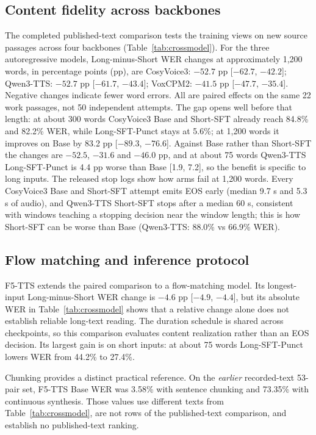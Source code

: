 \documentclass{article}
\begin{document}
\subsection{Content fidelity across backbones}
\label{sec:crossmodel}

The completed published-text comparison tests the training views on new source
passages across four backbones (Table~\ref{tab:crossmodel}). For the three
autoregressive models, Long-minus-Short WER changes at approximately 1,200 words,
in percentage points (pp), are CosyVoice3: $-52.7$ pp [$-62.7$, $-42.2$]; Qwen3-TTS:
$-52.7$ pp [$-61.7$, $-43.4$]; VoxCPM2: $-41.5$ pp [$-47.7$, $-35.4$].
Negative changes indicate fewer word errors. All are paired effects on the same
22 work passages, not 50 independent attempts. The gap opens well before that
length: at about 300 words CosyVoice3 Base and Short-SFT already reach 84.8\% and
82.2\% WER, while Long-SFT-Punct stays at 5.6\%; at 1,200 words it improves on Base
by 83.2 pp [$-89.3$, $-76.6$]. Against Base rather than Short-SFT
the changes are $-52.5$, $-31.6$ and $-46.0$ pp, and at about 75 words Qwen3-TTS
Long-SFT-Punct is 4.4 pp worse than Base [1.9, 7.2], so the benefit is specific
to long inputs. The released stop logs show how arms fail at 1,200 words. Every
CosyVoice3 Base and Short-SFT attempt emits EOS early (median 9.7 s and 5.3 s of
audio), and Qwen3-TTS Short-SFT stops after a median 60 s, consistent with windows
teaching a stopping decision near the window length; this is how Short-SFT can be
worse than Base (Qwen3-TTS: 88.0\% vs 66.9\% WER).

\subsection{Flow matching and inference protocol}
\label{sec:f5}

F5-TTS extends the paired comparison to a flow-matching model. Its longest-input
Long-minus-Short WER change is $-4.6$ pp [$-4.9$, $-4.4$], but its absolute WER in
Table~\ref{tab:crossmodel} shows that a relative change alone does not establish
reliable long-text reading. The duration schedule is shared across checkpoints,
so this comparison evaluates
content realization rather than an EOS decision. Its largest gain is on short
inputs: at about 75 words Long-SFT-Punct lowers WER from 44.2\% to 27.4\%.


Chunking provides a distinct practical reference. On the \emph{earlier} recorded-text
53-pair set, F5-TTS Base WER was 3.58\% with sentence chunking and
73.35\% with continuous synthesis. Those values use different texts from
Table~\ref{tab:crossmodel}, are not rows of the published-text comparison, and
establish no published-text ranking.
\end{document}

